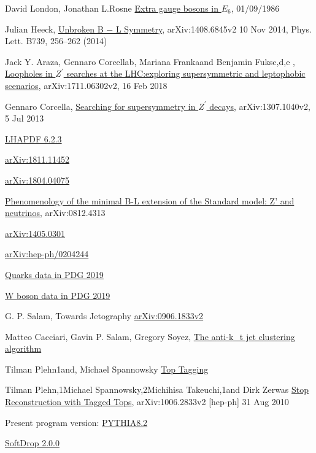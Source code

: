 \documentclass[12pt,a4paper]{article}		%
\begin{document}
\begin{thebibliography}{}
	 David London, Jonathan L.Rosne \href{https://journals.aps.org/prd/pdf/10.1103/PhysRevD.34.1530}{Extra gauge bosons in $E_6$}, 01/09/1986
	
	 Julian Heeck, \href{https://arxiv.org/pdf/1408.6845.pdf}{Unbroken B − L Symmetry}, arXiv:1408.6845v2 10 Nov 2014, Phys. Lett. B739, 256–262 (2014) 
	
	 Jack Y. Araza, Gennaro Corcellab, Mariana Frankaand Benjamin Fuksc,d,e , \href{https://arxiv.org/pdf/1711.06302.pdf}{Loopholes in $Z^\prime$ searches at the LHC:exploring supersymmetric and leptophobic scenarios}, arXiv:1711.06302v2, 16 Feb 2018 
	
	 Gennaro Corcella, \href{https://arxiv.org/pdf/1307.1040.pdf}{Searching for supersymmetry in $Z^\prime$ decays}, arXiv:1307.1040v2, 5 Jul 2013
	
	 \href{https://lhapdf.hepforge.org/pdfsets}{LHAPDF 6.2.3}
	
	 \href{https://arxiv.org/abs/1811.11452}{arXiv:1811.11452}
	
	 \href{https://arxiv.org/abs/1804.04075}{arXiv:1804.04075}
	
	 \href{https://arxiv.org/abs/0812.4313}{Phenomenology of the minimal B-L extension of the Standard model: Z' and neutrinos}, arXiv:0812.4313
	
	 \href{https://arxiv.org/abs/1405.0301}{arXiv:1405.0301}
	
	\href{https://arxiv.org/abs/hep-ph/0204244}{arXiv:hep-ph/0204244}
	
	 \href{http://pdg.lbl.gov/2019/tables/rpp2019-sum-quarks.pdf}{Quarks data in PDG 2019}
	
	 \href{http://pdg.lbl.gov/2019/listings/rpp2019-list-w-boson.pdf}{W boson data in PDG 2019}
	
	 G. P. Salam, Towards Jetography \href{https://arxiv.org/abs/0906.1833}{arXiv:0906.1833v2}
	
	 Matteo Cacciari, Gavin P. Salam, Gregory Soyez, \href{https://arxiv.org/abs/0802.1189}{The anti-k_t jet clustering algorithm} 
	
	 Tilman  Plehn1and, Michael Spannowsky \href{https://arxiv.org/pdf/1112.4441.pdf}{Top Tagging}
	
	 Tilman Plehn,1Michael Spannowsky,2Michihisa Takeuchi,1and Dirk Zerwas \href{https://arxiv.org/pdf/1006.2833.pdf}{Stop Reconstruction with Tagged Tops}, arXiv:1006.2833v2 [hep-ph] 31 Aug 2010
	
	 Present program version: \href{http://home.thep.lu.se/~torbjorn/Pythia.html}{PYTHIA8.2}
	
	 \href{https://phab.hepforge.org/source/fastjetsvn/browse/contrib/contribs/RecursiveTools/tags/2.0.0-beta2/}{SoftDrop 2.0.0 }
\end{thebibliography} 
\end{document}
